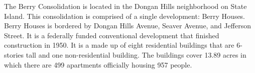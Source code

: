 The Berry Consolidation is located in the Dongan Hills neighborhood on State Island. This consolidation is comprised of a single development: Berry Houses. Berry Houses is bordered by Dongan Hills Avenue, Seaver Avenue, and Jefferson Street. It is a federally funded conventional development that finished construction in 1950. It is a made up of eight residential buildings that are 6- stories tall and one non-residential building. The buildings cover 13.89 acres in which there are 499 apartments officially housing 957 people.